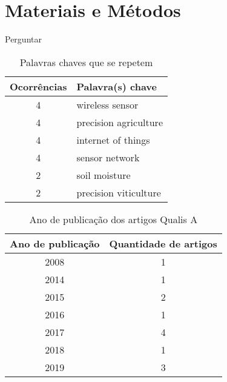 \documentclass[
article,			%
12pt,				%
oneside,			%
a4paper,			%
english,			%
brazil,				%
sumario=tradicional
]{abntex2}
\begin{document}
\section{Materiais e Métodos}\label{Materiais e Métodos}
Perguntar


\begin{table}[!htb]
  \centering
  \caption{Palavras chaves que se repetem}
  \begin{tabular}{|c|l|}
    \hline
    \textbf{Ocorrências} & \textbf{Palavra(s) chave} \\ \hline
    4                    & wireless sensor           \\ \hline
    4                    & precision agriculture     \\ \hline
    4                    & internet of things        \\ \hline
    4                    & sensor network            \\ \hline
    2                    & soil moisture             \\ \hline
    2                    & precision viticulture     \\ \hline
  \end{tabular}
\end{table}

\begin{table}[!htb]
  \centering
  \caption{Ano de publicação dos artigos Qualis A}
  \begin{tabular}{|c|c|}
    \hline
    \textbf{Ano de publicação} & \textbf{Quantidade de artigos} \\ \hline
    2008 & 1 \\ \hline
    2014 & 1 \\ \hline
    2015 & 2 \\ \hline
    2016 & 1 \\ \hline
    2017 & 4 \\ \hline
    2018 & 1 \\ \hline
    2019 & 3 \\ \hline
  \end{tabular}
\end{table}

%
\end{document}

